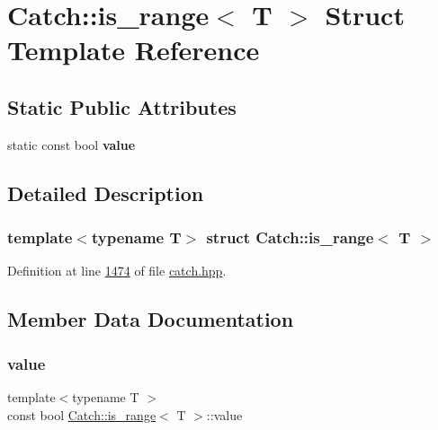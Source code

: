 \hypertarget{structCatch_1_1is__range}{}\section{Catch\+::is\+\_\+range$<$ T $>$ Struct Template Reference}
\label{structCatch_1_1is__range}
\subsection*{Static Public Attributes}
\begin{DoxyCompactItemize}
\item 
static const bool {\bfseries value}
\end{DoxyCompactItemize}


\subsection{Detailed Description}
\subsubsection*{template$<$typename T$>$\newline
struct Catch\+::is\+\_\+range$<$ T $>$}



Definition at line \mbox{\hyperlink{catch_8hpp_source_l01474}{1474}} of file \mbox{\hyperlink{catch_8hpp_source}{catch.\+hpp}}.



\subsection{Member Data Documentation}
\mbox{\label{structCatch_1_1is__range_afaec39e819c3956829cbbd00feba11be}} 
\subsubsection{\texorpdfstring{value}{value}}
{\footnotesize\ttfamily template$<$typename T $>$ \\
const bool \mbox{\hyperlink{structCatch_1_1is__range}{Catch\+::is\+\_\+range}}$<$ T $>$\+::value\hspace{0.3cm}{\ttfamily [static]}}

